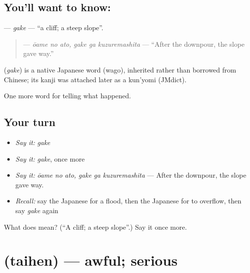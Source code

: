 \subsection*{You'll want to know: }
\textbf{} — \emph{gake} — \textquotedblleft{}a cliff; a steep slope\textquotedblright{}.

\begin{quote}
\textbf{  } — \emph{ōame no ato, gake ga kuzuremashita} — \textquotedblleft{}After the downpour, the slope gave way.\textquotedblright{}
\end{quote}

\begin{cousinweb}
\textbf{} (\emph{gake}) is a native Japanese word (wago), inherited rather than borrowed from Chinese; its kanji was attached later as a kun'yomi (JMdict).
\end{cousinweb}

\begin{grammarlens}[title={What you've built}]
One more word for telling what happened.
\end{grammarlens}

\subsection*{Your turn}
\begin{itemize}
\raggedright
  \item \emph{Say it:} \emph{gake}
  \item \emph{Say it:} \emph{gake}, once more
  \item \emph{Say it:} \emph{ōame no ato, gake ga kuzuremashita} — After the downpour, the slope gave way.
  \item \emph{Recall:} say the Japanese for a flood, then the Japanese for to overflow, then say \emph{gake} again
\end{itemize}

\begin{tcolorbox}[breakable,colback=teal!4,colframe=teal!35!black,title={Before you move on}]
What does  mean? (\textquotedblleft{}A cliff; a steep slope\textquotedblright{}.) Say it once more.
\end{tcolorbox}
\section[\texorpdfstring{\ja{たいへん} (taihen)}{たいへん (taihen)}]{ (taihen) — awful; serious}

